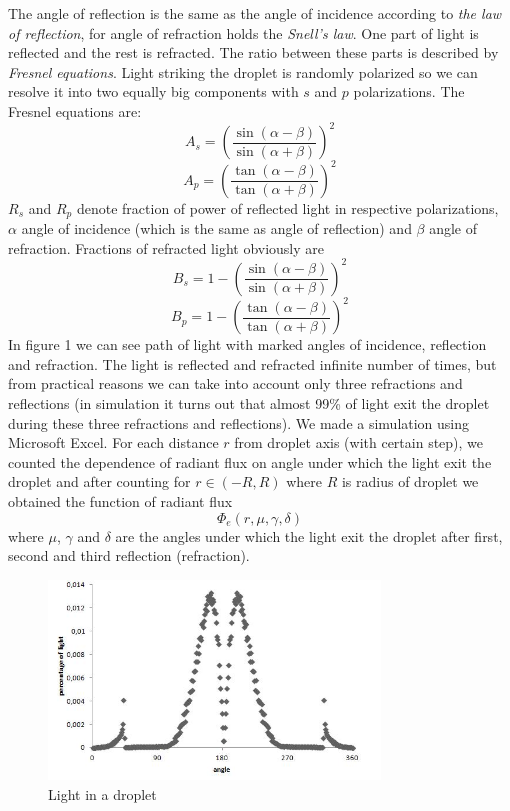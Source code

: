 \documentclass{cfp}
\begin{document}
The angle of reflection is the same as the angle of incidence according to \textit{the law of reflection}, for angle of refraction holds the \textit{Snell's law}. One part of light is reflected and the rest is refracted. The ratio between these parts is described by \textit{Fresnel equations}. Light striking the droplet is randomly polarized so we can resolve it into two equally big components with $s$ and $p$ polarizations. The Fresnel equations are:
$$A_{s}={\left(\frac{\sin{(\alpha-\beta)}}{\sin{(\alpha+\beta)}}\right)}^2$$
$$A_{p}={\left(\frac{\tan{(\alpha-\beta)}}{\tan{(\alpha+\beta)}}\right)}^2$$
$R_{s}$ and $R_{p}$ denote fraction of power of reflected light in respective polarizations, $\alpha$ angle of incidence (which is the same as angle of reflection) and $\beta$ angle of refraction. Fractions of refracted light obviously are
$$B_{s}=1-{\left(\frac{\sin{(\alpha-\beta)}}{\sin{(\alpha+\beta)}}\right)}^2$$
$$B_{p}=1-{\left(\frac{\tan{(\alpha-\beta)}}{\tan{(\alpha+\beta)}}\right)}^2$$
In figure 1 we can see path of light with marked angles of incidence, reflection and refraction. The light is reflected and refracted infinite number of times, but from practical reasons we can take into account only three refractions and reflections (in simulation it turns out that almost 99\% of light exit the droplet during these three refractions and reflections).
We made a simulation using Microsoft Excel. For each distance $r$ from droplet axis (with certain step), we counted the dependence of radiant flux on angle under which the light exit the droplet and after counting for $r\in\left( -R, R\right) $ where $R$ is radius of droplet we obtained the function of radiant flux
$$\Phi_{e}(r, \mu, \gamma, \delta)$$
where $\mu$, $\gamma$ and $\delta$ are the angles under which the light exit the droplet after first, second and third reflection (refraction).

\begin{figure}[!h]
\centering
\includegraphics[width=250pt]{dr.jpg}
\caption{Light in a droplet}
\end{figure}
\end{document}

